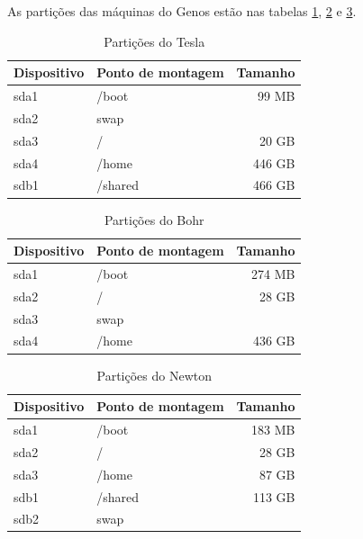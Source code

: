 \documentclass[12pt,brazil]{book}
\begin{document}
As partições das máquinas do Genos estão nas tabelas
\ref{tab:part-tesla}, \ref{tab:part-bohr} e \ref{tab:part-newton}.

\begin{table}[h]
  \centering
  \begin{tabular}{llr}
    Dispositivo & Ponto de montagem & Tamanho \\
    \hline
    sda1 & /boot & 99 MB \\
    sda2 & swap & \\
    sda3 & / & 20 GB \\
    sda4 & /home & 446 GB \\
    sdb1 & /shared & 466 GB \\
  \end{tabular}
  \caption{Partições do Tesla}
  \label{tab:part-tesla}
\end{table}

\begin{table}
  \centering
  \begin{tabular}{llr}
    Dispositivo & Ponto de montagem & Tamanho \\
    \hline
    sda1 & /boot & 274 MB \\
    sda2 & / & 28 GB \\
    sda3 & swap & \\
    sda4 & /home & 436 GB \\
  \end{tabular}
  \caption{Partições do Bohr}
  \label{tab:part-bohr}
\end{table}

\begin{table}
  \centering
  \begin{tabular}{llr}
    Dispositivo & Ponto de montagem & Tamanho \\
    \hline
    sda1 & /boot & 183 MB \\
    sda2 & / & 28 GB \\
    sda3 & /home & 87 GB \\
    sdb1 & /shared & 113 GB \\
    sdb2 & swap & \\
  \end{tabular}
  \caption{Partições do Newton}
  \label{tab:part-newton}
\end{table}
\end{document}
